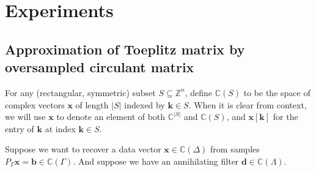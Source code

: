 \documentclass[11pt,draftcls,onecolumn]{IEEEtran}
\newcommand{\mbf}{\mathbf}
\begin{document}
\section{Experiments}
\subsection{Approximation of Toeplitz matrix by oversampled circulant matrix}
For any (rectangular, symmetric) subset $S\subseteq\mathbb{Z}^n$, define $\mathbb{C}(S)$ to be the space of complex vectors $\mbf x$ of length $|S|$ indexed by $\mbf k \in S$. When it is clear from context, we will use $\mbf x$ to denote an element of both $\mathbb{C}^{|S|}$ and $\mathbb{C}(S)$, and $\mbf x[\mbf k]$ for the entry of $\mbf k$ at index $\mbf k\in S$.

Suppose we want to recover a data vector $\mbf x \in \mathbb{C}(\Delta)$ from samples $P_\Gamma \mbf x = \mbf b \in \mathbb{C}(\Gamma)$. And suppose we have an annihilating filter $\mbf d \in \mathbb{C}(\Lambda)$. 
\end{document}
